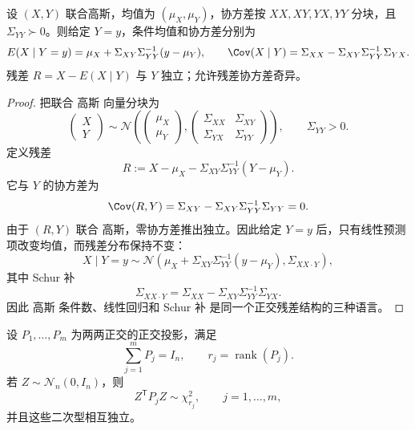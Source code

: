 \begin{proposition}
设 $(X,Y)$ 联合高斯，均值为 $(\mu_X,\mu_Y)$，协方差按 $XX,XY,YX,YY$ 分块，且 $\Sigma_{YY}\succ0$。则给定 $Y=y$，条件均值和协方差分别为
\[
E(X\mid Y=y)=\mu_X+\Sigma_{XY}\Sigma_{YY}^{-1}(y-\mu_Y),
\qquad
\Cov(X\mid Y)=\Sigma_{XX}-\Sigma_{XY}\Sigma_{YY}^{-1}\Sigma_{YX}.
\]
残差 $R=X-E(X\mid Y)$ 与 $Y$ 独立；允许残差协方差奇异。
\end{proposition}
\begin{proof}
把联合 高斯 向量分块为
\[
\begin{pmatrix}X\\Y\end{pmatrix}
\sim
\mathcal N\!\left(
\begin{pmatrix}\mu_X\\\mu_Y\end{pmatrix},
\begin{pmatrix}
\Sigma_{XX}&\Sigma_{XY}\\
\Sigma_{YX}&\Sigma_{YY}
\end{pmatrix}
\right),
\qquad \Sigma_{YY}>0.
\]
定义残差
\[
R
:=X-\mu_X
-\Sigma_{XY}\Sigma_{YY}^{-1}(Y-\mu_Y).
\]
它与 $Y$ 的协方差为
\[
\Cov(R,Y)
=\Sigma_{XY}
-\Sigma_{XY}\Sigma_{YY}^{-1}\Sigma_{YY}=0.
\]
由于 $(R,Y)$ 联合 高斯，零协方差推出独立。因此给定 $Y=y$ 后，只有线性预测项改变均值，而残差分布保持不变：
\begin{equation}
X\mid Y=y
\sim
\mathcal N\!\left(
\mu_X+\Sigma_{XY}\Sigma_{YY}^{-1}(y-\mu_Y),
\Sigma_{XX\cdot Y}
\right),
\label{eq:math-stat-gaussian-conditional}
\end{equation}
其中 Schur 补
\begin{equation}
\Sigma_{XX\cdot Y}
=
\Sigma_{XX}
-\Sigma_{XY}\Sigma_{YY}^{-1}\Sigma_{YX}.
\label{eq:math-stat-gaussian-schur-complement}
\end{equation}
因此 高斯 条件数、线性回归和 Schur 补 是同一个正交残差结构的三种语言。
\end{proof}


\begin{theorem}
设 $P_1,\ldots,P_m$ 为两两正交的正交投影，满足
\[
 \sum_{j=1}^mP_j=I_n,
 \qquad
 r_j=\operatorname{rank}(P_j).
\]
若 $Z\sim\mathcal N_n(0,I_n)$，则
\[
 Z^{\mathsf T}P_jZ\sim\chi^2_{r_j},
 \qquad j=1,\ldots,m,
\]
并且这些二次型相互独立。
\end{theorem}

